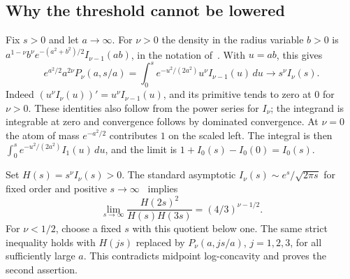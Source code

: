 \documentclass[11pt,a4paper]{article}
\numberwithin{equation}{section}
\theoremstyle{definition}
\theoremstyle{remark}
\begin{document}
\subsection{Why the threshold cannot be lowered}
Fix \(s>0\) and let \(a\to\infty\). For \(\nu>0\) the density in the
radius variable \(b>0\) is
\(a^{1-\nu} b^\nu e^{-(a^2+b^2)/2}I_{\nu-1}(ab)\), in the notation
of~\cite{r36heisei:SBZ}. With \(u=ab\), this gives
\[
e^{a^2/2}a^{2\nu}P_\nu(a,s/a)
 =\int_0^s e^{-u^2/(2a^2)}u^\nu I_{\nu-1}(u)\,du
 \longrightarrow s^\nu I_\nu(s).
\]
Indeed \((u^\nu I_\nu(u))'=u^\nu I_{\nu-1}(u)\), and its primitive
tends to zero at \(0\) for \(\nu>0\). These identities also follow from
the power series for \(I_\nu\); the integrand is integrable at zero and
convergence follows by dominated convergence. At \(\nu=0\) the atom of
mass \(e^{-a^2/2}\) contributes \(1\) on the scaled left. The integral is
then \(\int_0^s e^{-u^2/(2a^2)}I_1(u)\,du\), and the limit is
\(1+I_0(s)-I_0(0)=I_0(s)\).

Set \(H(s)=s^\nu I_\nu(s)>0\). The standard asymptotic
\(I_\nu(s)\sim e^s/\sqrt{2\pi s}\) for fixed order and positive
\(s\to\infty\)~\cite[10.40(i)]{r36heisei:DLMF} implies
\[
 \lim_{s\to\infty}\frac{H(2s)^2}{H(s)H(3s)}
   = (4/3)^{\nu-1/2}.
\]
For \(\nu<1/2\), choose a fixed \(s\) with this quotient below one.
The same strict inequality holds with \(H(js)\) replaced by
\(P_\nu(a,js/a)\), \(j=1,2,3\), for all sufficiently large \(a\).
This contradicts midpoint log-concavity and proves the second assertion.
\end{document}
